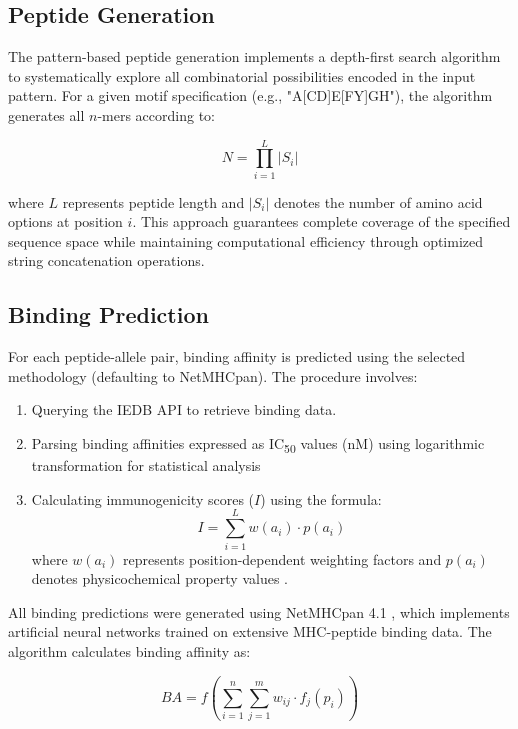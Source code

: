 \documentclass{article}
\begin{document}
\subsection{Peptide Generation}
The pattern-based peptide generation implements a depth-first search algorithm to systematically explore all combinatorial possibilities encoded in the input pattern. For a given motif specification (e.g., "A[CD]E[FY]GH"), the algorithm generates all $n$-mers according to:

\begin{equation}
N = \prod_{i=1}^{L} |S_i|
\end{equation}

where $L$ represents peptide length and $|S_i|$ denotes the number of amino acid options at position $i$. This approach guarantees complete coverage of the specified sequence space while maintaining computational efficiency through optimized string concatenation operations.

\subsection{Binding Prediction}
For each peptide-allele pair, binding affinity is predicted using the selected methodology (defaulting to NetMHCpan). The procedure involves:
\begin{enumerate}
    \item Querying the IEDB API to retrieve binding data.
    \item Parsing binding affinities expressed as IC\textsubscript{50} values (nM) using logarithmic transformation for statistical analysis
    \item Calculating immunogenicity scores ($I$) using the formula:
    \begin{equation}
        I = \sum_{i=1}^{L} w(a_i) \cdot p(a_i)
    \end{equation}
    where $w(a_i)$ represents position-dependent weighting factors and $p(a_i)$ denotes physicochemical property values \citep{smith2020immunogenicity}.
\end{enumerate}

All binding predictions were generated using NetMHCpan 4.1 \citep{reynisson2020netmhcpan}, which implements artificial neural networks trained on extensive MHC-peptide binding data. The algorithm calculates binding affinity as:

\begin{equation}
BA = f\left(\sum_{i=1}^{n} \sum_{j=1}^{m} w_{ij} \cdot f_j(p_i)\right)
\end{equation}
\end{document}

